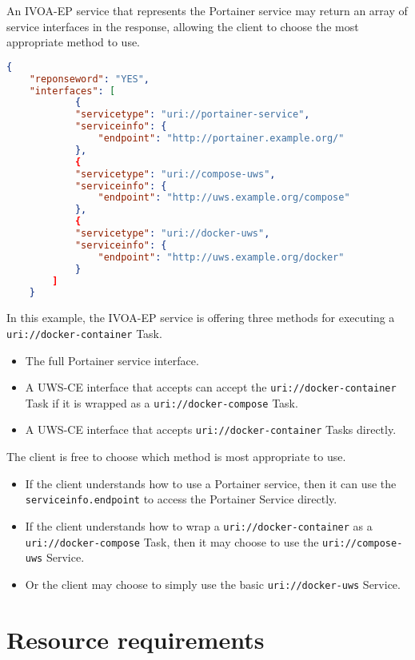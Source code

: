 \documentclass[11pt,a4paper]{ivoa}
\newcommand{\uwsce} {UWS-CE\xspace}
\newcommand{\ivoep} {IVOA-EP\xspace}
\newcommand{\portainer} {Portainer\xspace}
\newcommand{\codeword}[1] {\texttt{#1}}
\begin{document}
An \ivoep service that represents the \portainer service may return an array of service interfaces in the response, allowing the client to choose the most appropriate method to use.
\begin{lstlisting}[language=json]
    {
    "reponseword": "YES",
    "interfaces": [
            {
            "servicetype": "uri://portainer-service",
            "serviceinfo": {
                "endpoint": "http://portainer.example.org/"
            },
            {
            "servicetype": "uri://compose-uws",
            "serviceinfo": {
                "endpoint": "http://uws.example.org/compose"
            },
            {
            "servicetype": "uri://docker-uws",
            "serviceinfo": {
                "endpoint": "http://uws.example.org/docker"
            }
        ]
    }
\end{lstlisting}

In this example, the \ivoep service is offering three methods for executing a \codeword{uri://docker-container} Task.
\begin{itemize}
    \item The full \portainer service interface.
    \item A \uwsce interface that accepts can accept the \codeword{uri://docker-container} Task if it is wrapped as a \codeword{uri://docker-compose} Task.
    \item A \uwsce interface that accepts \codeword{uri://docker-container} Tasks directly.
\end{itemize}

The client is free to choose which method is most appropriate to use.
\begin{itemize}
    \item If the client understands how to use a \portainer service, then it can use the \codeword{serviceinfo.endpoint} to access the \portainer Service directly.
    \item If the client understands how to wrap a \codeword{uri://docker-container} as a \codeword{uri://docker-compose} Task, then it may choose to use the \codeword{uri://compose-uws} Service.
    \item Or the client may choose to simply use the basic \codeword{uri://docker-uws} Service.
\end{itemize}


\section{Resource requirements}
\label{sec:resource-requirements}
\end{document}
